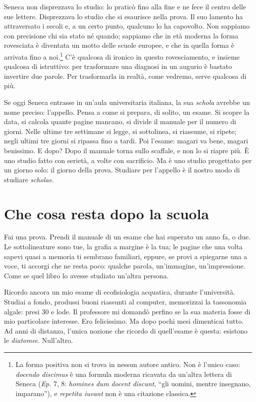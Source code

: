Seneca non disprezzava lo studio: lo praticò fino alla fine e ne fece
il centro delle sue lettere. Disprezzava lo studio che si esaurisce
nella prova. Il suo lamento ha attraversato i secoli e, a un certo
punto, qualcuno lo ha capovolto. Non sappiamo con precisione chi sia
stato né quando; sappiamo che in età moderna la forma rovesciata è
diventata un motto delle scuole europee, e che in quella forma è
arrivata fino a noi.\footnote{La forma positiva non si trova in nessun
autore antico. Non è l'unico caso: \emph{docendo discimus} è una
formula moderna ricavata da un'altra lettera di Seneca (\emph{Ep.} 7, 8:
\emph{homines dum docent discunt}, \enquote{gli uomini, mentre
insegnano, imparano}), e \emph{repetita iuvant} non è una citazione
classica.} C'è
qualcosa di ironico in questo rovesciamento, e insieme qualcosa di
istruttivo: per trasformare una diagnosi in un augurio è bastato
invertire due parole. Per trasformarla in realtà, come vedremo, serve
qualcosa di più.

Se oggi Seneca entrasse in un'aula universitaria italiana, la sua
\emph{schola} avrebbe un nome preciso: l'appello. Pensa a come si
prepara, di solito, un esame. Si scopre la data, si calcola quante
pagine mancano, si divide il manuale per il numero di giorni. Nelle
ultime tre settimane si legge, si sottolinea, si riassume, si ripete;
negli ultimi tre giorni si ripassa fino a tardi. Poi l'esame: magari
va bene, magari benissimo. E dopo? Dopo il manuale torna sullo
scaffale, e non lo si riapre più. È uno studio fatto con serietà, a
volte con sacrificio. Ma è uno studio progettato per un giorno solo: il
giorno della prova. Studiare per l'appello è il nostro modo di
studiare \emph{scholae}.

\section{Che cosa resta dopo la scuola}

Fai una prova. Prendi il manuale di un esame che hai superato un anno
fa, o due. Le sottolineature sono tue, la grafia a margine è la tua; le
pagine che una volta sapevi quasi a memoria ti sembrano familiari,
eppure, se provi a spiegarne una a voce, ti accorgi che ne resta poco:
qualche parola, un'immagine, un'impressione. Come se quel libro lo
avesse studiato un'altra persona.

Ricordo ancora un mio esame di ecofisiologia acquatica, durante l'università. Studiai a fondo, produssi buoni riassunti al computer, memorizzai la tassonomia algale: presi 30 e lode. Il professore mi domandò perfino se la sua materia fosse di mio particolare interesse. Ero felicissimo. Ma dopo pochi mesi dimenticai tutto. Ad anni di distanza, l'unica nozione che ricordo di quell'esame è questa: esistono le \emph{diatomee}. Null'altro.

